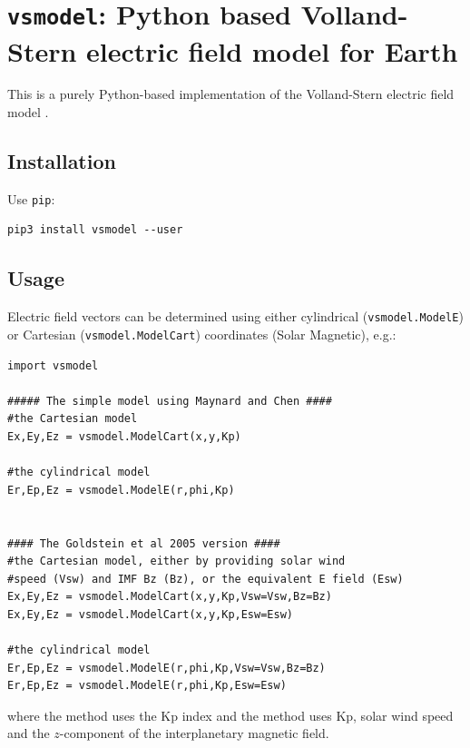 	\section{\texttt{vsmodel}: Python based Volland-Stern electric field model for Earth}
		
		This is a purely Python-based implementation of the Volland-Stern electric field model \citep{Volland1973,Stern1975}.

		\subsection{Installation}

		Use \texttt{pip}:
		\begin{verbatim}
pip3 install vsmodel --user
		\end{verbatim}

		\subsection{Usage}

			Electric field vectors can be determined using either cylindrical (\texttt{vsmodel.ModelE}) or Cartesian (\texttt{vsmodel.ModelCart}) coordinates (Solar Magnetic), e.g.:
			\begin{verbatim}
import vsmodel

##### The simple model using Maynard and Chen ####
#the Cartesian model
Ex,Ey,Ez = vsmodel.ModelCart(x,y,Kp)

#the cylindrical model
Er,Ep,Ez = vsmodel.ModelE(r,phi,Kp)


#### The Goldstein et al 2005 version ####
#the Cartesian model, either by providing solar wind 
#speed (Vsw) and IMF Bz (Bz), or the equivalent E field (Esw)
Ex,Ey,Ez = vsmodel.ModelCart(x,y,Kp,Vsw=Vsw,Bz=Bz)
Ex,Ey,Ez = vsmodel.ModelCart(x,y,Kp,Esw=Esw)

#the cylindrical model
Er,Ep,Ez = vsmodel.ModelE(r,phi,Kp,Vsw=Vsw,Bz=Bz)
Er,Ep,Ez = vsmodel.ModelE(r,phi,Kp,Esw=Esw)
			\end{verbatim}
			where the \citet{Maynard1975} method uses the Kp index and the \citet{Goldstein2005} method uses Kp, solar wind speed and the $z$-component of the interplanetary magnetic field.

